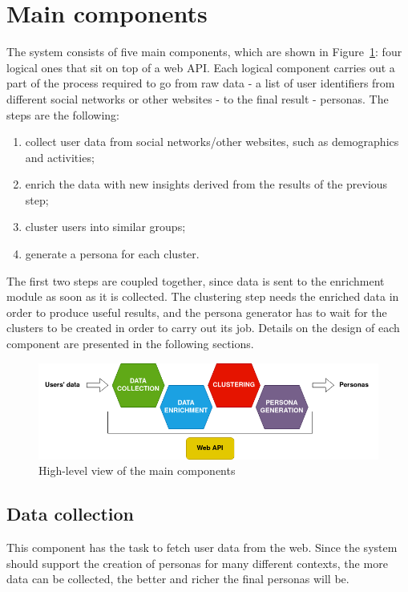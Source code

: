 \section{Main components}
\label{sec:main_components}
The system consists of five main components, which are shown in Figure~\ref{fig:logical_components}: four logical ones that sit on top of a web API. Each logical component carries out a part of the process required to go from raw data - a list of user identifiers from different social networks or other websites - to the final result - personas. The steps are the following:
\begin{enumerate}
    \item collect user data from social networks/other websites, such as demographics and activities;
    \item enrich the data with new insights derived from the results of the previous step;
    \item cluster users into similar groups;
    \item generate a persona for each cluster.
\end{enumerate}
The first two steps are coupled together, since data is sent to the enrichment module as soon as it is collected. The clustering step needs the enriched data in order to produce useful results, and the persona generator has to wait for the clusters to be created in order to carry out its job. Details on the design of each component are presented in the following sections.

\begin{figure}[t]
\centering
\includegraphics[width=1\textwidth]{img/Pipeline.png}
\caption{High-level view of the main components}
\label{fig:logical_components}
\end{figure}

\subsection{Data collection}
\label{subsec:data_collection}
This component has the task to fetch user data from the web. Since the system should support the creation of personas for many different contexts, the more data can be collected, the better and richer the final personas will be.

